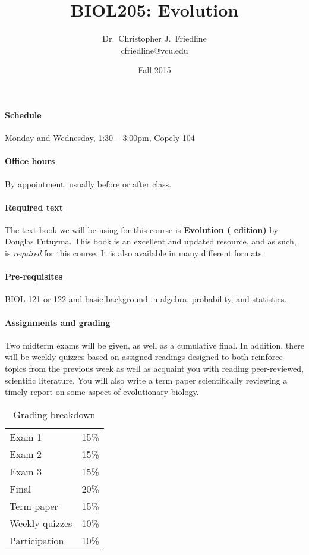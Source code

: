 \documentclass{article}
\title{BIOL205: Evolution}
\author{Dr.\ Christopher J.\ Friedline \\ cfriedline@vcu.edu}
\date{Fall 2015}
\begin{document}
\maketitle
\linespread{1.3}

\paragraph{Schedule}
Monday and Wednesday, 1:30 -- 3:00pm, Copely 104

\paragraph{Office hours}
By appointment, usually before or after class.

\paragraph{Required text}
The text book we will be using for this course is \textbf{Evolution (
edition)} by Douglas Futuyma. This book is an excellent and updated resource,
and as such, is \textit{required} for this course. It is also available in many
different formats.

\paragraph{Pre-requisites}
BIOL 121 or 122 and basic background in algebra, probability, and statistics.

\paragraph{Assignments and grading}
Two midterm exams will be given, as well
as a cumulative final.  In addition, there will be weekly quizzes based on
assigned readings designed to both reinforce topics from the previous week as
well as acquaint you with reading peer-reviewed, scientific literature.  You
will also write a term paper scientifically reviewing a timely report on some
aspect of evolutionary biology.

\begin{table}[h]
\centering
\caption*{Grading breakdown}

\begin{tabular}{l|r}
Exam 1          &   15\% \\
Exam 2          &   15\% \\
Exam 3			& 	15\% \\
Final           &   20\% \\ 
Term paper      &   15\% \\
Weekly quizzes  &	10\% \\
Participation   &   10\% \\

\end{tabular}

\end{table}
\end{document}
